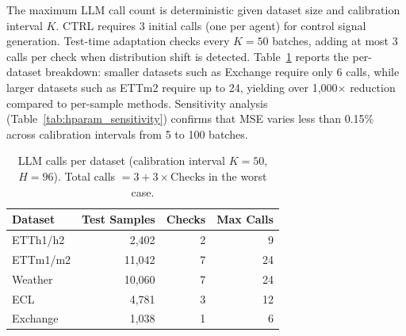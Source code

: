 The maximum LLM call count is deterministic given dataset size and calibration interval $K$. CTRL requires 3 initial calls (one per agent) for control signal generation. Test-time adaptation checks every $K{=}50$ batches, adding at most 3 calls per check when distribution shift is detected. Table~\ref{tab:llm_calls} reports the per-dataset breakdown: smaller datasets such as Exchange require only 6 calls, while larger datasets such as ETTm2 require up to 24, yielding over 1,000$\times$ reduction compared to per-sample methods. Sensitivity analysis (Table~\ref{tab:hparam_sensitivity}) confirms that MSE varies less than 0.15\% across calibration intervals from 5 to 100 batches.

\begin{table}[h!]
\centering
\small
\setlength{\tabcolsep}{4pt}
\begin{tabular}{lrrr}
\toprule
Dataset & Test Samples & Checks & Max Calls \\
\midrule
ETTh1/h2 & 2,402 & 2 & 9 \\
ETTm1/m2 & 11,042 & 7 & 24 \\
Weather & 10,060 & 7 & 24 \\
ECL & 4,781 & 3 & 12 \\
Exchange & 1,038 & 1 & 6 \\
\bottomrule
\end{tabular}
\caption{LLM calls per dataset (calibration interval $K{=}50$, $H{=}96$). Total calls $= 3 + 3 \times \text{Checks}$ in the worst case.}
\label{tab:llm_calls}
\end{table}
